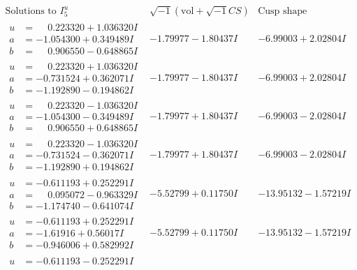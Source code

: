 \documentclass[1p]{elsarticle_modified}
\theoremstyle{definition}
\newcommand{\I}{\sqrt{-1}}
\begin{document}
$$\begin{array}{c|c|c}  
\text{Solutions to }I^u_{5}& \I (\text{vol} + \sqrt{-1}CS) & \text{Cusp shape}\\
 \hline 
\begin{aligned}
u &= \phantom{-}0.223320 + 1.036320 I \\
a &= -1.054300 + 0.349489 I \\
b &= \phantom{-}0.906550 - 0.648865 I\end{aligned}
 & -1.79977 - 1.80437 I & -6.99003 + 2.02804 I \\ \hline\begin{aligned}
u &= \phantom{-}0.223320 + 1.036320 I \\
a &= -0.731524 + 0.362071 I \\
b &= -1.192890 - 0.194862 I\end{aligned}
 & -1.79977 - 1.80437 I & -6.99003 + 2.02804 I \\ \hline\begin{aligned}
u &= \phantom{-}0.223320 - 1.036320 I \\
a &= -1.054300 - 0.349489 I \\
b &= \phantom{-}0.906550 + 0.648865 I\end{aligned}
 & -1.79977 + 1.80437 I & -6.99003 - 2.02804 I \\ \hline\begin{aligned}
u &= \phantom{-}0.223320 - 1.036320 I \\
a &= -0.731524 - 0.362071 I \\
b &= -1.192890 + 0.194862 I\end{aligned}
 & -1.79977 + 1.80437 I & -6.99003 - 2.02804 I \\ \hline\begin{aligned}
u &= -0.611193 + 0.252291 I \\
a &= \phantom{-}0.095072 - 0.963329 I \\
b &= -1.174740 - 0.641074 I\end{aligned}
 & -5.52799 + 0.11750 I & -13.95132 - 1.57219 I \\ \hline\begin{aligned}
u &= -0.611193 + 0.252291 I \\
a &= -1.61916 + 0.56017 I \\
b &= -0.946006 + 0.582992 I\end{aligned}
 & -5.52799 + 0.11750 I & -13.95132 - 1.57219 I \\ \hline\begin{aligned}
u &= -0.611193 - 0.252291 I \\

\end{aligned}
\end{array}$$
\end{document}
